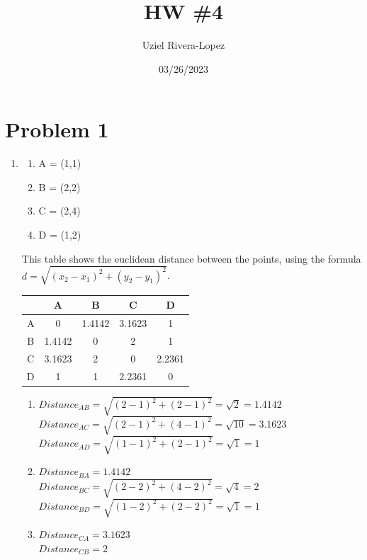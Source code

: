 \documentclass{article}
\title{HW \#4}
\author{
    Uziel Rivera-Lopez
}
\date{03/26/2023}
\begin{document}
\maketitle
\section*{Problem 1}
\begin{enumerate}[label=(\alph*)]
    \item 
    \begin{enumerate}[label=\arabic*.]
        \item A = (1,1)
        \item B = (2,2)
        \item C = (2,4)
        \item D = (1,2)
    \end{enumerate}
    This table shows the euclidean distance between the points, using the formula $ d= \sqrt{(x_2 - x_1)^2 + (y_2 - y_1)^2}$.
    \begin{center}
        \begin{tabular}{|c|c|c|c|c|}
            \hline
            & A & B & C & D \\
            \hline
            A & 0 & 1.4142 & 3.1623 & 1 \\
            \hline
            B & 1.4142 & 0 & 2 & 1 \\
            \hline
            C & 3.1623 & 2 & 0 & 2.2361 \\
            \hline
            D & 1 & 1 & 2.2361 & 0 \\
            \hline
        \end{tabular}
    \end{center}
    \begin{enumerate}
        \item $Distance_{AB} = \sqrt{(2-1)^2 + (2-1)^2} = \sqrt{2} = 1.4142$
        \\$Distance_{AC} = \sqrt{(2-1)^2 + (4-1)^2} = \sqrt{10} = 3.1623$
        \\$Distance_{AD} = \sqrt{(1-1)^2 + (2-1)^2} = \sqrt{1} = 1$
        \item $Distance_{BA} = 1.4142$
        \\$Distance_{BC} = \sqrt{(2-2)^2 + (4-2)^2} = \sqrt{4} = 2$
        \\$Distance_{BD} = \sqrt{(1-2)^2 + (2-2)^2} = \sqrt{1} = 1$
        \item $Distance_{CA} = 3.1623$
        \\ $Distance_{CB} = 2$

\end{enumerate}
\end{enumerate}
\end{document}
